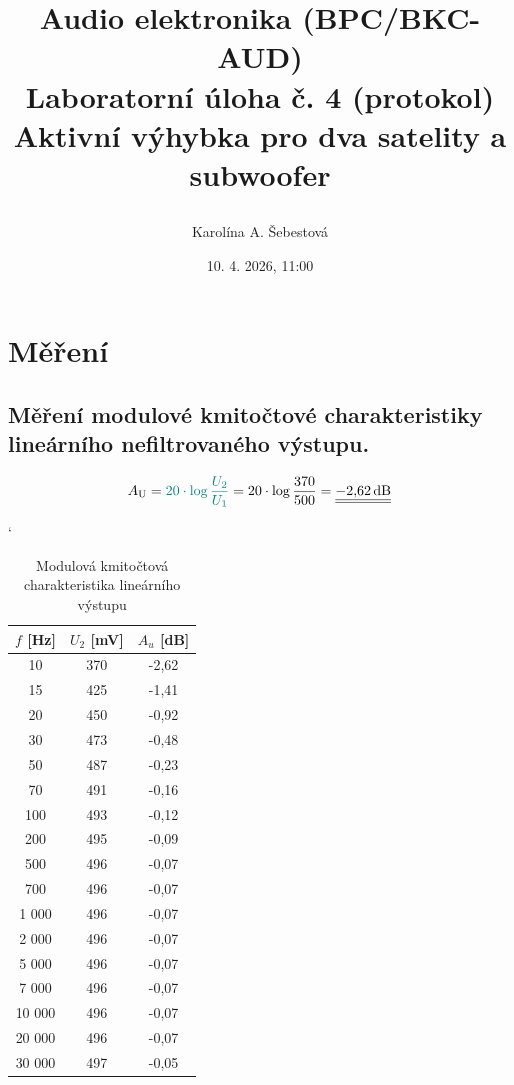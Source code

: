 \documentclass[a4paper, czech]{article}
\title{
    \begin{framed}
        \setstretch{1.5}
        {\large Audio elektronika (BPC/BKC-AUD)}\\
        Laboratorní úloha č. 4 (protokol)\\
        \textbf{Aktivní výhybka pro dva satelity a subwoofer}
    \end{framed}
    }
\author{Karolína A. Šebestová}
\date{10. 4. 2026, 11:00}
\begin{document}
\maketitle

\section{Měření}

\subsection{Měření modulové kmitočtové charakteristiky lineárního nefiltrovaného výstupu.}

\begin{equation}
    A_\text{U} = \textcolor{teal}{20 \cdot \log \frac{U_2}{U_1}} = 20 \cdot \log \frac{370}{500} = \underline{\underline{-2{,}62\,\text{dB}}}
\end{equation}

\begin{table}[H]
    \catcode`
    \centering
    \caption{Modulová kmitočtová charakteristika lineárního výstupu}
    \begin{tabular}{ccc}
        \toprule
        $f$ \textbf{[Hz]} & $U_2$ \textbf{[mV]} & $A_u$ \textbf{[dB]} \\
        \midrule
        10     & 370     & -2,62   \\
        15     & 425     & -1,41   \\
        20     & 450     & -0,92   \\
        30     & 473     & -0,48   \\
        50     & 487     & -0,23   \\
        70     & 491     & -0,16   \\
        100    & 493     & -0,12   \\
        200    & 495     & -0,09   \\
        500    & 496     & -0,07   \\
        700    & 496     & -0,07   \\
        1 000  & 496     & -0,07   \\
        2 000  & 496     & -0,07   \\
        5 000  & 496     & -0,07   \\
        7 000  & 496     & -0,07   \\
        10 000 & 496     & -0,07   \\
        20 000 & 496     & -0,07   \\
        30 000 & 497     & -0,05  \\
        \bottomrule
    \end{tabular}
\end{table}
\end{document}
